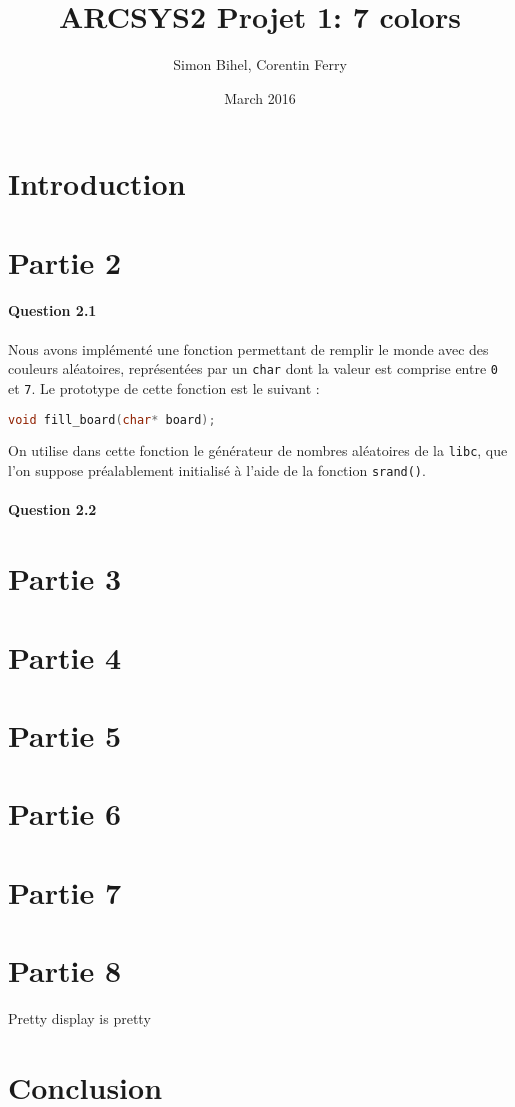 \documentclass[a4paper]{article}
\title{ARCSYS2 Projet 1: 7 colors}
\author{Simon Bihel, Corentin Ferry}
\date{March 2016}
\begin{document}
    \maketitle
    
    \section{Introduction}
    
    \section{Partie 2}
    \paragraph{Question 2.1}
    Nous avons implémenté une fonction permettant de remplir le monde avec 
des couleurs aléatoires, représentées par un \texttt{char} dont la valeur est
comprise entre \texttt{0} et \texttt{7}.
Le prototype de cette fonction est le suivant :
\begin{lstlisting}[language=C]
void fill_board(char* board);
\end{lstlisting}
On utilise dans cette fonction le générateur de nombres aléatoires de la 
\texttt{libc}, que l'on suppose préalablement initialisé à l'aide de la 
fonction \texttt{srand()}.

    \paragraph{Question 2.2}
    
    \section{Partie 3}
    
    \section{Partie 4}
    
    \section{Partie 5}
    
    \section{Partie 6}
    
    \section{Partie 7}
    
    \section{Partie 8}
    Pretty display is pretty
    
    \section{Conclusion}
    
\end{document}
